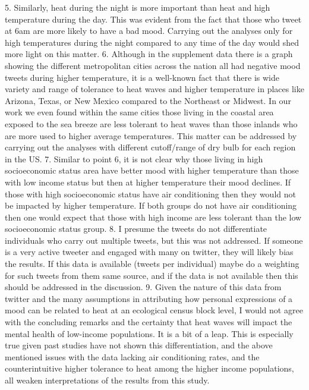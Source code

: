5. Similarly, heat during the night is more important than heat and high temperature during the day. This was evident from the fact that those who tweet at 6am are more likely to have a bad mood. Carrying out the analyses only for high temperatures during the night compared to any time of the day would shed more light on this matter.
6. Although in the supplement data there is a graph showing the different metropolitan cities across the nation all had negative mood tweets during higher temperature, it is a well-known fact that there is wide variety and range of tolerance to heat waves and higher temperature in places like Arizona, Texas, or New Mexico compared to the Northeast or Midwest. In our work we even found within the same cities those living in the coastal area exposed to the sea breeze are less tolerant to heat waves than those inlands who are more used to higher average temperatures. This matter can be addressed by carrying out the analyses with different cutoff/range of dry bulb for each region in the US.
7. Similar to point 6, it is not clear why those living in high socioeconomic status area have better mood with higher temperature than those with low income status but then at higher temperature their mood declines. If those with high socioeconomic status have air conditioning then they would not be impacted by higher temperature. If both groups do not have air conditioning then one would expect that those with high income are less tolerant than the low socioeconomic status group.
8. I presume the tweets do not differentiate individuals who carry out multiple tweets, but this was not addressed. If someone is a very active tweeter and engaged with many on twitter, they will likely bias the results. If this data is available (tweets per individual) maybe do a weighting for such tweets from them same source, and if the data is not available then this should be addressed in the discussion.
9. Given the nature of this data from twitter and the many assumptions in attributing how personal expressions of a mood can be related to heat at an ecological census block level, I would not agree with the concluding remarks and the certainty that heat waves will impact the mental health of low-income populations. It is a bit of a leap. This is especially true given past studies have not shown this differentiation, and the above mentioned issues with the data lacking air conditioning rates, and the counterintuitive higher tolerance to heat among the higher income populations, all weaken interpretations of the results from this study.

